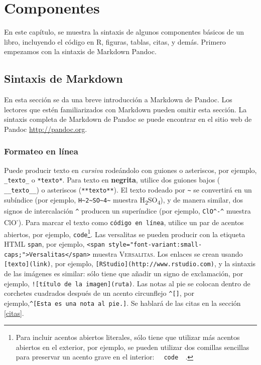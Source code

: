 \documentclass[12pt,]{krantz}
\theoremstyle{definition}
\theoremstyle{definition}
\theoremstyle{definition}
\theoremstyle{remark}
\begin{document}
\chapter{Componentes}\label{componentes}

En este capítulo, se muestra la sintaxis de algunos componentes básicos
de un libro, incluyendo el código en R, figuras, tablas, citas, y demás.
Primero empezamos con la sintaxis de Markdown Pandoc.

\section{Sintaxis de Markdown}\label{sintaxis-de-markdown}

En esta sección se da una breve introducción a Markdown de Pandoc. Los
lectores que estén familiarizados con Markdown pueden omitir esta
sección. La sintaxis completa de Markdown de Pandoc se puede encontrar
en el sitio web de Pandoc \url{http://pandoc.org}.

\subsection{Formateo en línea}\label{formateo-en-linea}

Puede producir texto en \emph{cursiva} rodeándolo con guiones o
asteriscos, por ejemplo, \texttt{\_texto\_} o \texttt{*texto*}. Para
texto en \textbf{negrita}, utilice dos guiones bajos (
\texttt{\_\_texto\_\_}) o asteriscos (\texttt{**texto**}). El texto
rodeado por \texttt{\textasciitilde{}} se convertirá en un subíndice
(por ejemplo,
\texttt{H\textasciitilde{}2\textasciitilde{}SO\textasciitilde{}4\textasciitilde{}}
muestra H\textsubscript{2}SO\textsubscript{4}), y de manera similar, dos
signos de intercalación \texttt{\^{}} producen un superíndice (por
ejemplo, \texttt{ClO\^{}-\^{}} muestra ClO\textsuperscript{-}). Para
marcar el texto como \texttt{código\ en\ línea}, utilice un par de
acentos abiertos, por ejemplo,
\texttt{\textasciigrave{}code\textasciigrave{}}\footnote{Para incluir
  acentos abiertos literales, sólo tiene que utilizar más acentos
  abiertos en el exterior, por ejemplo, se pueden utilizar dos comillas
  sencillas para preservar un acento grave en el interior:
  \texttt{\textasciigrave{}\textasciigrave{}\ \textasciigrave{}\ code\ \textasciigrave{}\ \textasciigrave{}\textasciigrave{}}.}.
Las versalitas se pueden producir con la etiqueta HTML \texttt{span},
por ejemplo,
\texttt{\textless{}span\ style="font-variant:small-caps;"\textgreater{}Versalitas\textless{}/span\textgreater{}}
muestra \textsc{Versalitas}. Los enlaces se crean usando
\texttt{{[}texto{]}(link)}, por ejemplo,
\texttt{{[}RStudio{]}(http://www.rstudio.com)}, y la sintaxis de las
imágenes es similar: sólo tiene que añadir un signo de exclamación, por
ejemplo, \texttt{!{[}título\ de\ la\ imagen{]}(ruta)}. Las notas al pie
se colocan dentro de corchetes cuadrados después de un acento
circunflejo \texttt{\^{}{[}{]}}, por
ejemplo,\texttt{\^{}{[}Esta\ es\ una\ nota\ al\ pie.{]}}. Se hablará de
las citas en la sección \ref{citas}.
\end{document}

